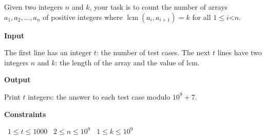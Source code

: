 Given two integers $n$ and $k$, your task is to count the number of arrays $a_1, a_2,\dots, a_n$ of positive integers where $\operatorname{lcm}(a_i, a_{i+1}) = k$ for all $1 \le i $<$ n$.

\vspace{0.3cm}\noindent\textbf{Input}

The first line has an integer $t$: the number of test cases.
The next $t$ lines have two integers $n$ and $k$: the length of the array and the value of lcm.

\vspace{0.3cm}\noindent\textbf{Output}

Print $t$ integers: the answer to each test case modulo $10^9 + 7$.

\vspace{0.3cm}\noindent\textbf{Constraints}

\textbullet\ $1 \le t \le 1000$
\textbullet\ $2 \le n \le 10^9$
\textbullet\ $1 \le k \le 10^9$